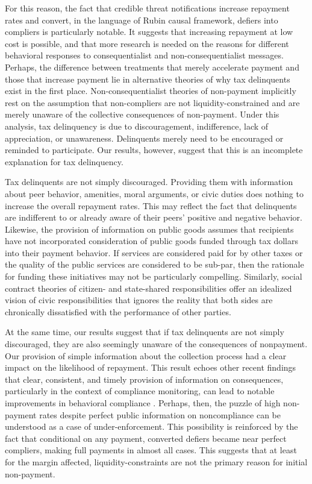 \documentclass[12pt,titlepage]{article}
\begin{document}
For this reason, the fact that credible threat notifications increase 
repayment rates and convert, in the language of Rubin causal framework, 
defiers into compliers is particularly notable. It suggests that 
increasing repayment at low cost is possible, and that more research is 
needed on the reasons for different behavioral responses to 
consequentialist and non-consequentialist messages. Perhaps, the difference 
between treatments that merely accelerate payment and those that increase 
payment lie in alternative theories of why tax delinquents exist in the 
first place. Non-consequentialist theories of non-payment implicitly rest 
on the assumption that non-compliers are not liquidity-constrained and are
merely unaware of the collective consequences of non-payment. Under this 
analysis, tax delinquency is due to discouragement, indifference, 
lack of appreciation, or unawareness. Delinquents merely need to be 
encouraged or reminded to participate. Our results, however, suggest 
that this is an incomplete explanation for tax delinquency. 

Tax delinquents are not simply discouraged. Providing them with 
information about peer behavior, amenities, moral arguments, or civic 
duties does nothing to increase the overall repayment rates. This may 
reflect the fact that delinquents are indifferent to or already aware 
of their peers' positive and negative behavior. Likewise, the provision 
of information on public goods assumes that recipients have not 
incorporated consideration of public goods funded through tax dollars 
into their payment behavior. If services are considered paid for by 
other taxes or the quality of the public services are considered to be 
sub-par, then the rationale for funding these initiatives may not be 
particularly compelling.  Similarly, social contract theories of citizen- 
and state-shared responsibilities offer an idealized vision of civic 
responsibilities that ignores the reality that both sides are chronically 
dissatisfied with the performance of other parties.

At the same time, our results suggest that if tax delinquents are not 
simply discouraged, they are also seemingly unaware of the consequences 
of nonpayment. Our provision of simple information about the collection 
process had a clear impact on the likelihood of repayment. This result 
echoes other recent findings that clear, consistent, and timely provision 
of information on consequences, particularly in the context of compliance 
monitoring, can lead to notable improvements in behavioral compliance 
\citep{hawken}. Perhaps, then, the puzzle of high non-payment 
rates despite perfect public information on noncompliance can be understood 
as a case of under-enforcement. This possibility is reinforced by the fact 
that conditional on any payment, converted defiers became near perfect 
compliers, making full payments in almost all cases. This suggests that at 
least for the margin affected, liquidity-constraints are not the primary 
reason for initial non-payment.

\newpage


\end{document}
